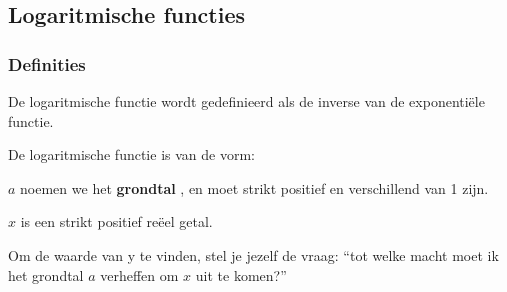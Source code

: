 

\subsection{Logaritmische functies}


\subsubsection{Definities}

\noindent De logaritmische functie wordt gedefinieerd als de inverse
van de exponenti\"ele functie.

\noindent De logaritmische functie is van de vorm:

\noindent \vspace{0.2cm}


\vspace{0.5cm}


\noindent $a$ noemen we het \textbf{grondtal} , en moet strikt positief
en verschillend van 1 zijn.

\noindent $x$ is een strikt positief re\"eel getal.

\medskip{}


\noindent Om de waarde van y te vinden, stel je jezelf de vraag: ``tot
welke macht moet ik het grondtal $a$ verheffen om $x$ uit te komen?''\medskip{}


